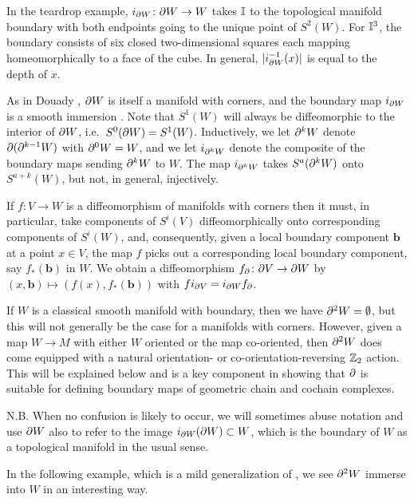 In the teardrop example, $i_{\partial W} \colon \partial W \to W$ takes $\mathbb{I}$ to the topological manifold boundary with both endpoints going to the unique point of $S^2(W)$.
For $\mathbb{I}^3$, the boundary consists of six closed two-dimensional squares each mapping homeomorphically to a face of the cube.
In general, $|i_{\partial W}^{-1}(x)|$ is equal to the depth of $x$.

As in Douady \cite{Doua61}, $\partial W$ is itself a manifold with corners, and the boundary map $i_{\partial W}$ is a smooth immersion \cite[Theorem 3.4]{Joy12}. Note that $S^1(W)$ will always be diffeomorphic to the interior of $\partial W$, i.e.\ $S^0(\partial W) = S^1(W)$.
Inductively, we let $\partial^k W$ denote $\partial (\partial^{k-1} W)$ with $\partial^0 W = W$, and we let $i_{\partial^k W}$ denote the composite of the boundary maps sending $\partial^k W$ to $W$. The map $i_{\partial^k W}$ takes $S^a(\partial^k W)$ onto $S^{a+k}(W)$, but not, in general, injectively.

\begin{remark}\label{R: bd diff}
	If $f \colon V \to W$ is a diffeomorphism of manifolds with corners then it must, in particular, take components of $S^i(V)$ diffeomorphically onto corresponding components of $S^i(W)$, and, consequently, given a local boundary component $\mathbf{b}$ at a point $x \in V$, the map $f$ picks out a corresponding local boundary component, say $f_*(\mathbf{b})$ in $W$. We obtain a diffeomorphism $f_\partial \colon \partial V \to \partial W$ by $(x,\mathbf{b})\mapsto (f(x),f_*(\mathbf{b}))$ with $fi_{\partial V} = i_{\partial W} f_\partial$.
\end{remark}

If $W$ is a classical smooth manifold with boundary, then we have $\partial^2 W=\emptyset$, but this will not generally be the case for a manifolds with corners.
However, given a map $W \to M$ with either $W$ oriented or the map co-oriented, then $\partial^2 W$ does come equipped with a natural orientation- or co-orientation-reversing $\mathbb{Z}_2$ action.
This will be explained below and is a key component in showing that $\partial$ is suitable for defining boundary maps of geometric chain and cochain complexes.

N.B. When no confusion is likely to occur, we will sometimes abuse notation and use $\partial W$ also to refer to the image $i_{\partial W}(\partial W) \subset W$, which is the boundary of $W$ as a topological manifold in the usual sense.

In the following example, which is a mild generalization of \cite[Example 7.3]{Joy12}, we see $\partial^2 W$ immerse into $W$ in an interesting way.

